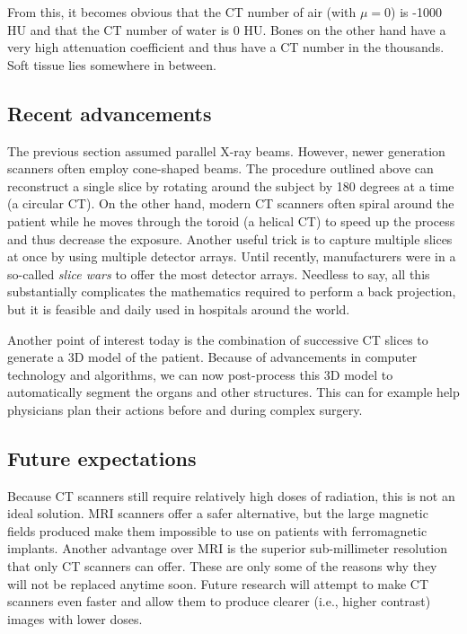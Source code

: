 From this, it becomes obvious that the CT number of air (with $\mu = 0$) is
-1000 HU and that the CT number of water is 0 HU. Bones on the other hand have a
very high attenuation coefficient and thus have a CT number in the thousands.
Soft tissue lies somewhere in between.

\subsection{Recent advancements}
The previous section assumed parallel X-ray beams. However, newer generation
scanners often employ cone-shaped beams. The procedure outlined above can
reconstruct a single slice by rotating around the subject by 180 degrees at a
time (a circular CT). On the other hand, modern CT scanners often spiral around
the patient while he moves through the toroid (a helical CT) to speed up the
process and thus decrease the exposure. Another useful trick is to capture
multiple slices at once by using multiple detector arrays. Until recently,
manufacturers were in a so-called \emph{slice wars} to offer the most detector
arrays. Needless to say, all this substantially complicates the mathematics
required to perform a back projection, but it is feasible and daily used in
hospitals around the world.

Another point of interest today is the combination of successive CT slices to
generate a 3D model of the patient. Because of advancements in computer
technology and algorithms, we can now post-process this 3D model to
automatically segment the organs and other structures. This can for example help
physicians plan their actions before and during complex surgery.

\subsection{Future expectations}
Because CT scanners still require relatively high doses of radiation, this is
not an ideal solution. MRI scanners offer a safer alternative, but the large
magnetic fields produced make them impossible to use on patients with ferromagnetic
implants. Another advantage over MRI is the superior sub-millimeter resolution
that only CT scanners can offer. These are only some of the reasons why they
will not be replaced anytime soon. Future research will attempt to make CT
scanners even faster and allow them to produce clearer (i.e., higher contrast)
images with lower doses.